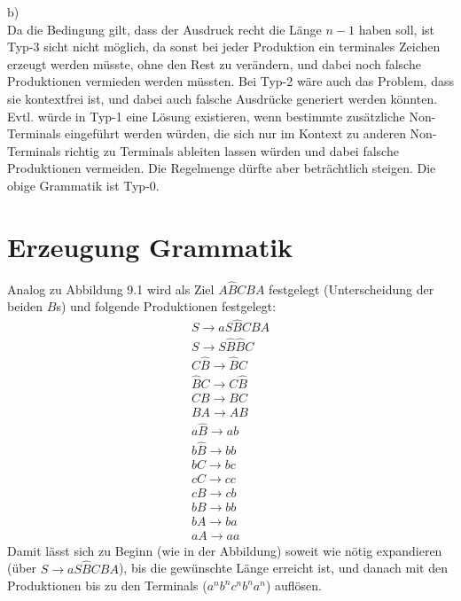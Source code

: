 \documentclass[a4paper,10pt,headlines=3.2]{scrartcl}
\begin{document}
b) \\
Da die Bedingung gilt, dass der Ausdruck recht die Länge $n-1$ haben soll, ist Typ-3 sicht nicht möglich, da sonst bei jeder Produktion ein terminales Zeichen erzeugt werden müsste, ohne den Rest zu verändern, und dabei noch falsche Produktionen vermieden werden müssten. Bei Typ-2 wäre auch das Problem, dass sie kontextfrei ist, und dabei auch falsche Ausdrücke generiert werden könnten. Evtl. würde in Typ-1 eine Lösung existieren, wenn bestimmte zusätzliche Non-Terminals eingeführt werden würden, die sich nur im Kontext zu anderen Non-Terminals richtig zu Terminals ableiten lassen würden und dabei falsche Produktionen vermeiden. Die Regelmenge dürfte aber beträchtlich steigen. Die obige Grammatik ist Typ-0.

\section{Erzeugung Grammatik}
Analog zu Abbildung 9.1 wird als Ziel $A\hat{B}CBA$ festgelegt (Unterscheidung der beiden $B$s) und folgende Produktionen festgelegt:
\begin{align}
S \rightarrow aS\hat{B} CBA \\
S \rightarrow S\hat{B} \hat{B}C \\
C\hat{B}  \rightarrow \hat{B}C \\
\hat{B}C  \rightarrow  C\hat{B} \\
CB  \rightarrow  BC \\
BA  \rightarrow  AB \\
a\hat{B}  \rightarrow  ab \\
b\hat{B}  \rightarrow  bb \\
bC  \rightarrow  bc \\
cC   \rightarrow cc \\
cB  \rightarrow  cb \\
bB  \rightarrow bb \\
bA  \rightarrow ba \\
aA  \rightarrow aa
\end{align}
Damit lässt sich zu Beginn (wie in der Abbildung) soweit wie nötig expandieren (über $S \rightarrow aS\hat{B} CBA$), bis die gewünschte Länge erreicht ist, und danach mit den Produktionen bis zu den Terminals ($a^n b^n c^n b^n a^n$) auflösen.
\end{document}
